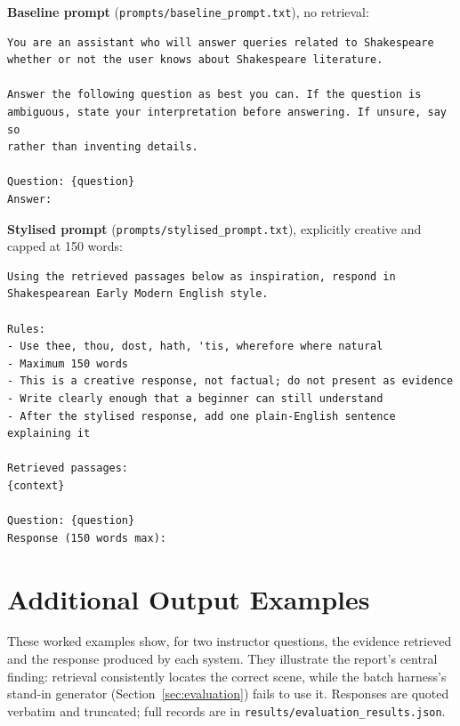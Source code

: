 \noindent\textbf{Baseline prompt} (\texttt{prompts/baseline\_prompt.txt}),
no retrieval:
\begin{lstlisting}
You are an assistant who will answer queries related to Shakespeare
whether or not the user knows about Shakespeare literature.

Answer the following question as best you can. If the question is
ambiguous, state your interpretation before answering. If unsure, say so
rather than inventing details.

Question: {question}
Answer:
\end{lstlisting}

\noindent\textbf{Stylised prompt} (\texttt{prompts/stylised\_prompt.txt}),
explicitly creative and capped at 150 words:
\begin{lstlisting}
Using the retrieved passages below as inspiration, respond in
Shakespearean Early Modern English style.

Rules:
- Use thee, thou, dost, hath, 'tis, wherefore where natural
- Maximum 150 words
- This is a creative response, not factual; do not present as evidence
- Write clearly enough that a beginner can still understand
- After the stylised response, add one plain-English sentence explaining it

Retrieved passages:
{context}

Question: {question}
Response (150 words max):
\end{lstlisting}

\section{Additional Output Examples}
\label{app:examples}

These worked examples show, for two instructor questions, the evidence
retrieved and the response produced by each system. They illustrate the
report's central finding: retrieval consistently locates the correct
scene, while the batch harness's stand-in generator
(Section~\ref{sec:evaluation}) fails to use it. Responses are quoted
verbatim and truncated; full records are in
\texttt{results/evaluation\_results.json}.

